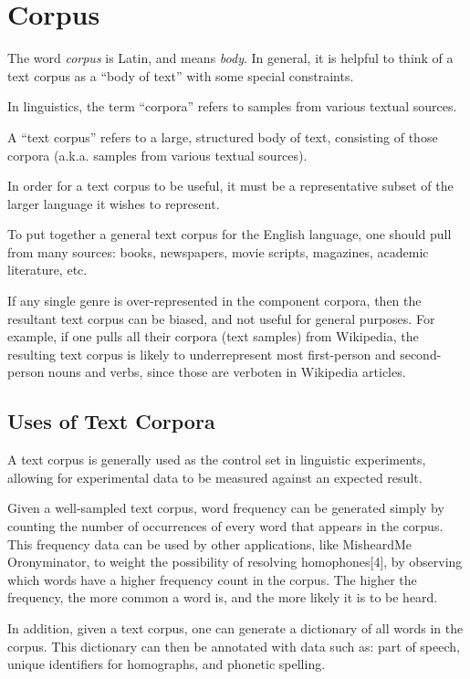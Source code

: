 \section{Corpus}
\label{section:corpusDef}

The word \emph{corpus} is Latin, and means \emph{body}.  In general, it is helpful to think of a text corpus as a ``body of text'' with some special constraints.

In linguistics, the term ``corpora'' refers to samples from various textual sources.
  
A ``text corpus''  refers to a large, structured body of text, consisting of those corpora (a.k.a. samples from various textual sources). 

In order for a text corpus to be useful, it must be a representative subset of the larger language it wishes to represent. 

To put together a general text corpus for the English language, one should pull from many sources: books, newspapers, movie scripts, magazines, academic literature, etc. 

If any single genre is over-represented in the component corpora, then the resultant text corpus can be biased, and not useful for general purposes. For example, if one pulls all their corpora (text samples) from Wikipedia, the resulting text corpus is likely to underrepresent most first-person and second-person nouns and verbs, since those are verboten in Wikipedia articles.

\subsection{Uses of Text Corpora}
\label{vocab:usesOfTextCorpora}

A text corpus is generally used as the control set in linguistic experiments, allowing for experimental data to be measured against an expected result.

Given a well-sampled text corpus, word frequency can be generated simply by counting the number of occurrences of every word that appears in the corpus. This frequency data can be used by other applications, like MisheardMe Oronyminator, to weight the possibility of resolving homophones[4], by observing which words have a higher frequency count in the corpus. The higher the frequency, the more common a word is, and the more likely it is to be heard.

In addition, given a text corpus, one can generate a dictionary of all words in the corpus. This dictionary can then be annotated with data such as: part of speech, unique identifiers for homographs, and phonetic spelling. 


